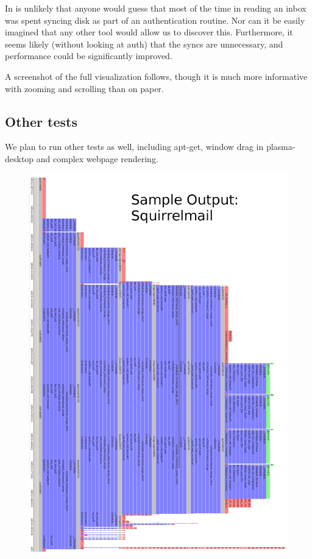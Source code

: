 \documentclass[10pt]{article}
\begin{document}
In is unlikely that anyone would guess that most of the time in reading an inbox was spent syncing disk as part of an authentication routine.  Nor can it be easily imagined that any other tool would allow us to discover this.  Furthermore, it seems likely (without looking at auth) that the syncs are unnecessary, and performance could be significantly improved.

A screenshot of the full visualization follows, though it is much more informative with zooming and scrolling than on paper.

\subsection{Other tests}

We plan to run other tests as well, including apt-get, window drag in plasma-desktop and complex webpage rendering.

\newpage


\begin{figure}
\includegraphics[width=6in]{squirrelmail}
\end{figure}
\end{document}
